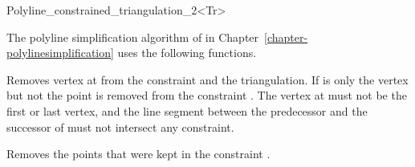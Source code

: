 \begin{ccRefClass}{Polyline_constrained_triangulation_2<Tr>}






The polyline simplification algorithm of in Chapter~\ref{chapter-polylinesimplification}
uses the following functions.

{Removes vertex at  from the constraint and the triangulation.
If  is  only the vertex but not the point is removed from the constraint .
\ccPrecond The vertex at  must not be the first or last vertex, and the line segment between the predecessor  and 
the successor  of  must not intersect any constraint.} 

{Removes the points that were kept in the constraint .}


\end{ccRefClass}
